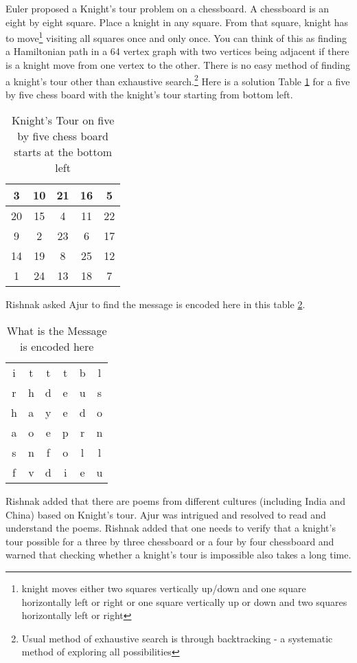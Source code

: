 Euler proposed a Knight's tour problem on a chessboard. A chessboard is an eight by eight square. Place a knight in any square. From that square, knight has to move\footnote{knight moves either two squares vertically up/down and one square horizontally left or right or one square vertically up or down and two squares horizontally left or right} visiting all squares once and only once. You can think of this as finding a Hamiltonian path in a 64 vertex graph with two vertices being adjacent if there is a knight move from one vertex to the other. There is no easy method of finding a knight's tour other than exhaustive search.\footnote{Usual method of exhaustive search is through backtracking - a systematic method of exploring all possibilities} Here is a solution Table \ref{5t1} for a five by five chess board with the knight's tour starting from bottom left.
\begin{table}
\centering
\begin{tabular}{|c |c |c| c| c|} 
 \hline
3&10&21&16& 5\\
\hline
20&15& 4&11&22\\
\hline
 9& 2&23& 6&17\\
 \hline
14&19& 8&25&12\\
\hline
 1&24&13&18& 7\\
 \hline
\end{tabular}
\caption{Knight's Tour on five by five chess board starts at the bottom left}
\label{5t1}
\end{table}
Rishnak asked Ajur to find the message is encoded here in this table \ref{5t2}.
\begin{table}
\centering
\begin{tabular}{c c c c cc}
i& t& t& t& b& l\\
r& h &d &e& u& s\\
h& a& y& e& d& o\\
a& o& e& p& r& n\\
s& n& f& o& l& l\\
f& v& d &i& e& u\\
\end{tabular}
\caption{What is the Message is encoded here}
\label{5t2}
\end{table}
Rishnak added that there are poems from different cultures (including India and China) based on Knight's tour. Ajur was intrigued and resolved to read and understand the poems. Rishnak added that one needs to verify that a knight's tour possible for a three by three chessboard or a four by four chessboard and warned that checking whether a knight's tour is impossible also takes a long time.

